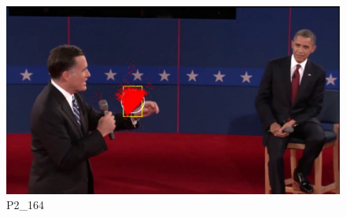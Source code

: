 \documentclass[10pt, conference, compsocconf]{IEEEtran}
\begin{document}
\begin{figure}[H]
	\centering
	\includegraphics[scale = 0.20]{image/164.jpg}
	\caption{P2\_164}
	\label{fig:164}
\end{figure}
\end{document}
